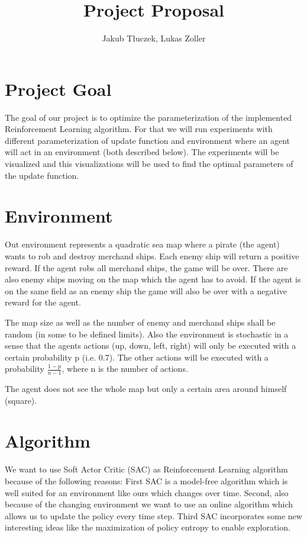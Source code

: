 \documentclass[11pt]{article} %
\title{Project Proposal}
\author{Jakub Tłuczek, Lukas Zoller}
\begin{document}
\maketitle

\section{Project Goal}
The goal of our project is to optimize the parameterization of the implemented Reinforcement Learning algorithm. For that we will run experiments with different parameterization of update function and environment where an agent will act in an environment (both described below). The experiments will be visualized and this visualizations will be used to find the optimal parameters of the update function.

\section{Environment}
Out environment represents a quadratic sea map where a pirate (the agent) wants to rob and destroy merchand ships. Each enemy ship will return a positive reward. If the agent robs all merchand ships, the game will be over. There are also enemy ships moving on the map which the agent has to avoid. If the agent is on the same field as an enemy ship the game will also be over with a negative reward for the agent.

The map size as well as the number of enemy and merchand ships shall be random (in some to be defined limits). Also the environment is stochastic in a sense that the agents actions (up, down, left, right) will only be executed with a certain probability p (i.e. 0.7). The other actions will be executed with a probability $\frac{1-p}{n-1}$, where n is the number of actions. 

The agent does not see the whole map but only a certain area around himself (square). 

\section{Algorithm}
We want to use Soft Actor Critic (SAC) as Reinforcement Learning algorithm because of the following reasons: First SAC is a model-free algorithm which is well suited for an environment like ours which changes over time. Second, also because of the changing environment we want to use an online algorithm which allows us to update the policy every time step. Third SAC incorporates some new interesting ideas like the maximization of policy entropy to enable exploration.
\end{document}
